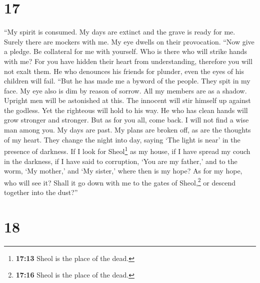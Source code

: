 \hypertarget{section-16}{%
\section{17}\label{section-16}}

 ``My spirit is consumed. My days are extinct and the
grave is ready for me.  Surely there are mockers with me.
My eye dwells on their provocation.  ``Now give a pledge.
Be collateral for me with yourself. Who is there who will strike hands
with me?  For you have hidden their heart from
understanding, therefore you will not exalt them.  He who
denounces his friends for plunder, even the eyes of his children will
fail.  ``But he has made me a byword of the people. They
spit in my face.  My eye also is dim by reason of sorrow.
All my members are as a shadow.  Upright men will be
astonished at this. The innocent will stir himself up against the
godless.  Yet the righteous will hold to his way. He who
has clean hands will grow stronger and stronger.  But as
for you all, come back. I will not find a wise man among you.
 My days are past. My plans are broken off, as are the
thoughts of my heart.  They change the night into day,
saying `The light is near' in the presence of darkness. 
If I look for Sheol\footnote{\textbf{17:13} Sheol is the place of the
  dead.} as my house, if I have spread my couch in the darkness,
 if I have said to corruption, `You are my father,' and
to the worm, `My mother,' and `My sister,'  where then is
my hope? As for my hope, who will see it?  Shall it go
down with me to the gates of Sheol,\footnote{\textbf{17:16} Sheol is the
  place of the dead.} or descend together into the dust?''

\hypertarget{section-17}{%
\section{18}\label{section-17}}

